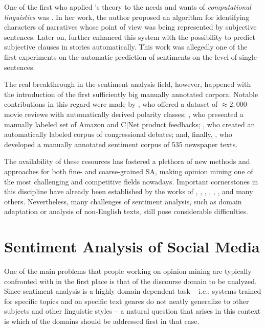 One of the first who applied \citeauthor{Banfield:82}'s theory to the
needs and wants of \emph{computational linguistics} was
\citet{Wiebe:90a}.  In her work, the author proposed an algorithm for
identifying characters of narratives whose point of view was being
represented by subjective sentences.  Later on, \citet{Wiebe:94}
further enhanced this system with the possibility to predict
subjective clauses in stories automatically.  This work was allegedly
one of the first experiments on the automatic prediction of sentiments
on the level of single sentences.

The real breakthrough in the sentiment analysis field, however,
happened with the introduction of the first sufficiently big manually
annotated corpora.  Notable contributions in this regard were made by
\citet{Pang:04,Pang:05}, who offered a dataset of $\approx2,000$ movie
reviews with automatically derived polarity classes; \citet{Hu:04},
who presented a manually labeled set of Amazon and C|Net product
feedbacks; \citet{Thomas:06}, who created an automatically labeled
corpus of congressional debates; and, finally, \citet{Wiebe:05}, who
developed a manually annotated sentiment corpus of 535 newspaper
texts.

The availability of these resources has fostered a plethora of new
methods and approaches for both fine- and coarse-grained SA, making
opinion mining one of the most challenging and competitive fields
nowadays.  Important cornerstones in this discipline have already been
established by the works of \citet{Pang:02}, \citet{Wiebe:05},
\citet{Wilson:05}, \citet{Breck:07}, \citet{Choi:09,Choi:10},
\citet{Yessenalina:11}, \citet{Socher:11, Socher:12} and many others.
Nevertheless, many challenges of sentiment analysis, such as domain
adaptation or analysis of non-English texts, still pose considerable
difficulties.

\section{Sentiment Analysis of Social Media}

One of the main problems that people working on opinion mining are
typically confronted with in the first place is that of the discourse
domain to be analyzed.  Since sentiment analysis is a highly
domain-dependent task \citep[cf.][]{Aue:05,Blitzer:07,Li:08} -- i.e.,
systems trained for specific topics and on specific text genres do not
neatly generalize to other subjects and other linguistic styles -- a
natural question that arises in this context is which of the domains
should be addressed first in that case.

